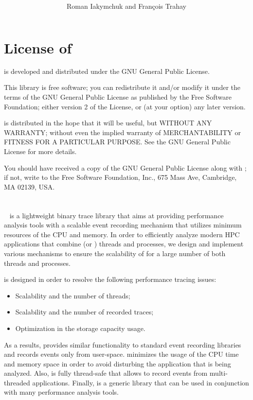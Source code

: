 

\title{
{\Huge\bf \reporttitle{}}\\[6mm]
{\LARGE\bf \reportsubtitle}\\[12mm]
{\Large\bf \reportsubsubtitle}}
\author{Roman Iakymchuk and Fran\c{c}ois Trahay}


\maketitle

\tableofcontents

\chapter{License of \litl}
\litl{} is developed and distributed under the GNU General Public License.

This library is free software; you can redistribute it and/or modify it under 
the terms of the GNU General Public License as published by the Free Software 
Foundation; either version 2 of the License, or (at your option) any later 
version.

\litl{} is distributed in the hope that it will be useful, but WITHOUT ANY 
WARRANTY; without even the implied warranty of MERCHANTABILITY or FITNESS FOR A 
PARTICULAR PURPOSE. See the GNU General Public License for more details.

You should have received a copy of the GNU General Public License along with 
\litl{}; if not, write to the Free Software Foundation, Inc., 675 Mass Ave, 
Cambridge, MA 02139, USA.


\chapter{\litl}
\litl{}~\cite{litl} is a lightweight binary trace library that aims at 
providing performance analysis tools with a scalable event recording mechanism 
that utilizes minimum resources of the CPU and memory. In order to efficiently 
analyze modern HPC applications that combine \openmp{} (or \pthread) threads 
and \mpi{} processes, we design and implement various mechanisms to ensure the 
scalability of \litl{} for a large  number of both threads and processes. 

\litl{} is designed in order to resolve the following performance tracing 
issues:
\begin{itemize}
 \item Scalability and the number of threads;
 \item Scalability and the number of recorded traces;
 \item Optimization in the storage capacity usage.
\end{itemize}
As a results, \litl{} provides similar functionality to standard event recording 
libraries and records events only from user-space. \litl{} minimizes the usage 
of the CPU time and memory space in order to avoid disturbing the application 
that is being analyzed. Also, \litl{} is fully thread-safe that allows to record 
events from multi-threaded applications. Finally, \litl{} is a generic library 
that can be used in conjunction with many performance analysis tools. 


